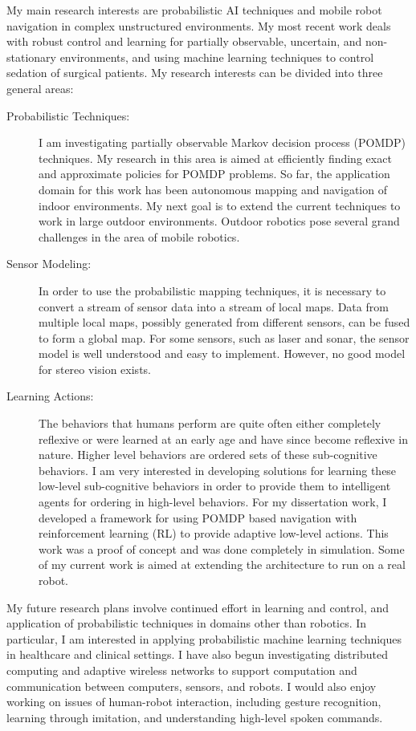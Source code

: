 

My main research interests are probabilistic AI techniques and mobile
robot navigation in complex unstructured environments.  My most recent
work deals with robust control and learning for partially observable,
uncertain, and non-stationary environments, and using machine learning
techniques to control sedation of surgical patients.  My research
interests can be divided into three general areas:
\begin{description}
\item[Probabilistic Techniques:] I am investigating partially
  observable Markov decision process (POMDP) techniques.  My research
  in this area is aimed at efficiently finding exact and approximate
  policies for POMDP problems.  So far, the application domain for
  this work has been autonomous mapping and navigation of indoor
  environments.  My next goal is to extend the current techniques to
  work in large outdoor environments. Outdoor robotics pose several
  grand challenges in the area of mobile robotics.

\item[Sensor Modeling:]
 In order to use the probabilistic mapping techniques, it is necessary to
 convert a stream of sensor data into a stream of local maps.  Data from
 multiple local maps, possibly generated from different sensors, can be
 fused to form a global map.  For some sensors, such as laser and sonar,
 the sensor model is well understood and easy to implement.  However, no
 good model for stereo vision exists.

\item[Learning Actions:] The behaviors that humans perform are quite
  often either completely reflexive or were learned at an early age
  and have since become reflexive in nature. Higher level behaviors
  are ordered sets of these sub-cognitive behaviors. I am very
  interested in developing solutions for learning these low-level
  sub-cognitive behaviors in order to provide them to intelligent
  agents for ordering in high-level behaviors. For my dissertation
  work, I developed a framework for using POMDP based navigation with
  reinforcement learning (RL) to provide adaptive low-level actions.
  This work was a proof of concept and was done completely in
  simulation.  Some of my current work is aimed at extending the
  architecture to run on a real robot.
\end{description}

My future research plans involve continued effort in learning and
control, and application of probabilistic techniques in domains other
than robotics.  In particular, I am interested in applying
probabilistic machine learning techniques in healthcare and clinical
settings. I have also begun investigating distributed computing and
adaptive wireless networks to support computation and communication
between computers, sensors, and robots.  I would also enjoy working on
issues of human-robot interaction, including gesture recognition,
learning through imitation, and understanding high-level spoken
commands.

